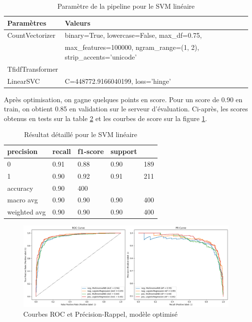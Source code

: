 \documentclass{article}
\begin{document}
\begin{table}[H]
    \centering
    \begin{tabular}{ll}
        Paramètres & Valeurs \\ \hline
        CountVectorizer & binary=True, lowercase=False, max\_df=0.75, \\
        ~ & max\_features=100000, ngram\_range=(1, 2), strip\_accents='unicode' \\ 
        TfidfTransformer &  \\ 
        LinearSVC & C=448772.9166040199, loss='hinge' \\ 
    \end{tabular}
    \caption{Paramètre de la pipeline pour le SVM linéaire}
    \label{table:svmparams}
\end{table}

Après optimisation, on gagne quelques points en score. Pour un score de 0.90 en train, on obtient 0.85 en validation sur le serveur d'évaluation. Ci-après, les scores obtenus en tests sur la table \ref{table:logregmovies} et les courbes de score sur la figure \ref{roc_curve_opti}.

\begin{table}[H]
    \centering
    \begin{tabular}{lllll}
        precision & recall & f1-score & support & ~ \\ \hline
        0 & 0.91 & 0.88 & 0.90 & 189 \\ 
        1 & 0.90 & 0.92 & 0.91 & 211 \\ 
        accuracy & 0.90 & 400 & ~ & ~ \\ 
        macro avg & 0.90 & 0.90 & 0.90 & 400 \\ 
        weighted avg & 0.90 & 0.90 & 0.90 & 400 \\ 
    \end{tabular}
    \caption{Résultat détaillé pour le SVM linéaire}
    \label{table:logregmovies}
\end{table}

\begin{figure}[H]
    \centering
    \includegraphics[width=\textwidth]{./src/movies/roc_curve_opti.png} 
    \caption{Courbes ROC et Précision-Rappel, modèle optimisé}
    \label{roc_curve_opti}
\end{figure}
\end{document}
